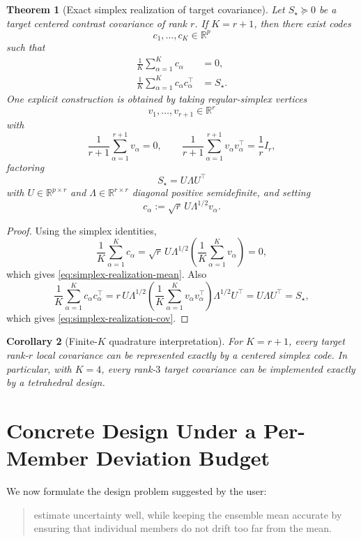 \documentclass[11pt]{article}
\newcommand{\R}{\mathbb{R}}
\newtheorem{theorem}{Theorem}
\newtheorem{corollary}[theorem]{Corollary}
\theoremstyle{remark}
\begin{document}
\begin{theorem}[Exact simplex realization of target covariance]
\label{thm:simplex-realization}
Let $S_\star\succeq 0$ be a target centered contrast covariance of rank $r$. If $K=r+1$, then there exist codes
\[
c_1,\dots,c_K\in\R^p
\]
such that
\begin{align}
\frac1K\sum_{\alpha=1}^K c_\alpha &= 0,
\label{eq:simplex-realization-mean}\\
\frac1K\sum_{\alpha=1}^K c_\alpha c_\alpha^\top &= S_\star.
\label{eq:simplex-realization-cov}
\end{align}
One explicit construction is obtained by taking regular-simplex vertices
\[
v_1,\dots,v_{r+1}\in\R^r
\]
with
\[
\frac1{r+1}\sum_{\alpha=1}^{r+1} v_\alpha = 0,
\qquad
\frac1{r+1}\sum_{\alpha=1}^{r+1} v_\alpha v_\alpha^\top = \frac1r I_r,
\]
factoring
\[
S_\star = U\Lambda U^\top
\]
with $U\in\R^{p\times r}$ and $\Lambda\in\R^{r\times r}$ diagonal positive semidefinite, and setting
\[
c_\alpha := \sqrt r\, U\Lambda^{1/2}v_\alpha.
\]
\end{theorem}

\begin{proof}
Using the simplex identities,
\[
\frac1K\sum_{\alpha=1}^K c_\alpha
=
\sqrt r\, U\Lambda^{1/2}
\left(
\frac1K\sum_{\alpha=1}^K v_\alpha
\right)
=
0,
\]
which gives \eqref{eq:simplex-realization-mean}. Also
\[
\frac1K\sum_{\alpha=1}^K c_\alpha c_\alpha^\top
=
r\,U\Lambda^{1/2}
\left(
\frac1K\sum_{\alpha=1}^K v_\alpha v_\alpha^\top
\right)
\Lambda^{1/2}U^\top
=
U\Lambda U^\top
=
S_\star,
\]
which gives \eqref{eq:simplex-realization-cov}.
\end{proof}

\begin{corollary}[Finite-$K$ quadrature interpretation]
\label{cor:quadrature}
For $K=r+1$, every target rank-$r$ local covariance can be represented \emph{exactly} by a centered simplex code. In particular, with $K=4$, every rank-$3$ target covariance can be implemented exactly by a tetrahedral design.
\end{corollary}

\section{Concrete Design Under a Per-Member Deviation Budget}

We now formulate the design problem suggested by the user:

\begin{quote}
estimate uncertainty well, while keeping the ensemble mean accurate by ensuring that individual members do not drift too far from the mean.
\end{quote}
\end{document}
